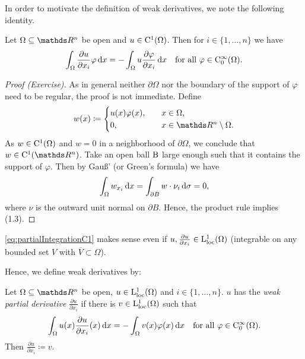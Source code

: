 In order to motivate the definition of weak derivatives, we note the following identity.

\begin{lem}
  \label{lem:partialIntegrationC1}
  Let $\Omega \subseteq \R^n$ be open and $u \in \mathrm{C}^1(\Omega)$. 
  Then for $i \in \{1,\dots,n\}$ we have
  \begin{equation}
    \label{eq:partialIntegrationC1}
    \int_\Omega \frac{\partial u}{\partial x_i} \varphi \, {\operatorname{d}\!{x}} = -\int_\Omega u \frac{\partial \varphi}{\partial x_i} \, {\operatorname{d}\!{x}} \quad \text{for all } \varphi \in \mathrm{C}_0^\infty(\Omega).
  \end{equation}
\end{lem}

\begin{proof}[Proof (Exercise)]
  As in general neither $\partial \Omega$ nor the boundary of the support of $\varphi$ need to be regular, the proof is not immediate.
  Define
  $$
  w(x) \coloneqq  \begin{cases} u(x) \varphi(x), \quad &x \in \Omega, \\
    0, \quad &x \in \R^n \setminus \Omega .\end{cases}
  $$
  As $w \in \mathrm{C}^1(\Omega)$ and $w = 0$ in a neighborhood of $\partial \Omega$, we conclude that $w \in \CC^1(\R^n)$.
  Take an open ball $\mathrm{B}$ large enough such that it contains the support of $\varphi$. 
  Then by Gauß' (or Green's formula) we have
  $$
  \int_\Omega w_{x_i} \, {\operatorname{d}\!{x}} 
  = \int_{\partial B} w \cdot \nu_i \, {\operatorname{d}\!{\sigma}} = 0,
  $$
  where $\nu$ is the outward unit normal on $\partial B$.
  Hence, the product rule implies (1.3).
\end{proof}
\eqref{eq:partialIntegrationC1} makes sense even if $u, \frac{\partial u}{\partial x_i} \in \mathrm{L}_{\operatorname{loc}}^1(\Omega)$ (integrable on any bounded set $V$ with $\overline V \subset \Omega$).

Hence, we define weak derivatives by:

\begin{defn}
  Let $\Omega \subseteq \R^n$ be open, $u \in \mathrm{L}_{\operatorname{loc}}^1(\Omega)$ and $i \in \{1,\dots,n\}$.
  $u$ has the \emph{weak partial derivative} $\frac{\partial u}{\partial x_i}$ if there is $v \in \mathrm{L}_{\operatorname{loc}}^1(\Omega)$ such that
  \begin{equation}
    \label{eq:weakDerivativeDef}
    \int_\Omega u(x) \frac{\partial u}{\partial x_i}(x) \, {\operatorname{d}\!{x}} = -\int_\Omega v(x) \varphi(x) \, {\operatorname{d}\!{x}} \quad \text{for all } \varphi \in \mathrm{C}_0^\infty(\Omega).    
  \end{equation}
  Then $\frac{\partial u}{\partial x_i} \coloneqq v$.
\end{defn}

